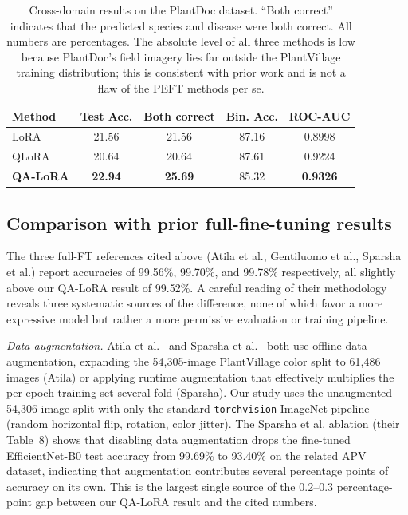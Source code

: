 \documentclass[conference]{IEEEtran}
\begin{document}
\begin{table}[htbp]
\caption{Cross-domain results on the PlantDoc dataset. ``Both correct'' indicates that the predicted species and disease were both correct. All numbers are percentages. The absolute level of all three methods is low because PlantDoc's field imagery lies far outside the PlantVillage training distribution; this is consistent with prior work and is not a flaw of the PEFT methods per se.}
\begin{center}
\begin{tabular}{|l|c|c|c|c|}
\hline
\textbf{Method} & \textbf{Test Acc.} & \textbf{Both correct} & \textbf{Bin. Acc.} & \textbf{ROC-AUC} \\
\hline
LoRA     & 21.56 & 21.56 & 87.16 & 0.8998 \\
QLoRA    & 20.64 & 20.64 & 87.61 & 0.9224 \\
\textbf{QA-LoRA} & \textbf{22.94} & \textbf{25.69} & 85.32 & \textbf{0.9326} \\
\hline
\end{tabular}
\label{tab:plantdoc}
\end{center}
\end{table}

\subsection{Comparison with prior full-fine-tuning results}
The three full-FT references cited above (Atila et al., Gentiluomo et al., Sparsha et al.) report accuracies of 99.56\%, 99.70\%, and 99.78\% respectively, all slightly above our QA-LoRA result of 99.52\%. A careful reading of their methodology reveals three systematic sources of the difference, none of which favor a more expressive model but rather a more permissive evaluation or training pipeline.

\textit{Data augmentation.} Atila et al.~\cite{atila2021} and Sparsha et al.~\cite{sparsha2025} both use offline data augmentation, expanding the 54{,}305-image PlantVillage color split to 61{,}486 images (Atila) or applying runtime augmentation that effectively multiplies the per-epoch training set several-fold (Sparsha). Our study uses the unaugmented 54{,}306-image split with only the standard \texttt{torchvision} ImageNet pipeline (random horizontal flip, rotation, color jitter). The Sparsha et al. ablation (their Table~8) shows that disabling data augmentation drops the fine-tuned EfficientNet-B0 test accuracy from 99.69\% to 93.40\% on the related APV dataset, indicating that augmentation contributes several percentage points of accuracy on its own. This is the largest single source of the 0.2--0.3 percentage-point gap between our QA-LoRA result and the cited numbers.
\end{document}
